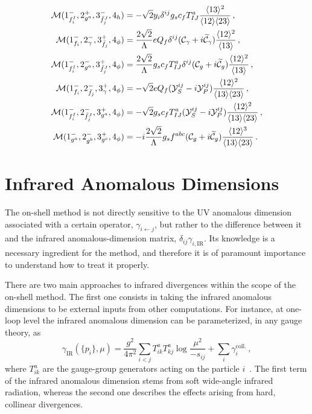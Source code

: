 \begin{subappendices}
\begin{align}
    \mathcal M(1^-_{f_i^I},2^+_{g^a},3^-_{\bar f_j^J},4_h) &= -\sqrt{2} y_i \delta^{ij} g_s c_f T^a_{IJ} \frac{\langle 1 3 \rangle^2}{\langle 1 2 \rangle\langle 2 3 \rangle} \,,\\
    \mathcal M(1^-_{f_i},2^-_\gamma,3^+_{\bar f_j},4_\phi) &= \frac{2\sqrt 2}{\Lambda} e Q_f \delta^{ij}(\mathcal C_\gamma + i\widetilde{\mathcal C}_\gamma)\frac{\langle 1 2 \rangle^2}{\langle 1 3 \rangle}\,,\\
    \mathcal M(1^-_{f_i^I},2^-_{g^a},3^+_{\bar f_j^J},4_\phi) &= \frac{2\sqrt 2}{\Lambda} g_s c_f T^a_{IJ} \delta^{ij}(\mathcal C_g + i\widetilde{\mathcal C}_g)\frac{\langle 1 2 \rangle^2}{\langle 1 3 \rangle}\,,\\
    \mathcal M(1^-_{f_i},2^-_{\bar f_j},3^+_\gamma,4_\phi) &= -\sqrt 2 e Q_f (\mathcal Y_S^{ij}-i\mathcal Y_P^{ij})\frac{\langle 1 2 \rangle^2}{\langle 1 3 \rangle\langle 2 3 \rangle} \,,\\
    \mathcal M(1^-_{f_i^I},2^-_{\bar f_j^J},3^+_{g^a},4_\phi) &= -\sqrt 2 g_s c_f T^a_{IJ} (\mathcal Y_S^{ij}-i\mathcal Y_P^{ij})\frac{\langle 1 2 \rangle^2}{\langle 1 3 \rangle\langle 2 3 \rangle}\,,\\
    \mathcal M(1^-_{g^a},2^-_{g^b},3^+_{g^c},4_\phi) &= -i\frac{2\sqrt 2}{\Lambda}g_sf^{abc}(\mathcal C_g+i\widetilde{\mathcal C}_g)\frac{\langle 1 2 \rangle^3}{\langle 1 3 \rangle\langle 2 3 \rangle}\,.
\end{align}

\section{Infrared Anomalous Dimensions}
\label{app:ALP_IR}

The on-shell method is not directly sensitive to the UV anomalous dimension associated
with a certain operator, $\gamma_{i\leftarrow j}$, but rather to the difference between it and
the infrared anomalous-dimension matrix, $\delta_{ij} \gamma_{i,\text{IR}}$.
Its knowledge is a necessary ingredient for the method, and therefore it is of paramount
importance to understand how to treat it properly.

There are two main approaches to infrared divergences within the scope of the on-shell method.
The first one consists in taking the infrared anomalous dimensions to be external inputs from
other computations.
For instance, at one-loop level the infrared anomalous dimension can be parameterized, in any
gauge theory, as
\begin{equation}
    \gamma_{\text{IR}} (\{p_i\}, \mu) = \frac{g^2}{4 \pi^2} \sum_{i<j} T^a_{ik} T^a_{kj} \log \frac{\mu^2}{-s_{ij}} + \sum_i \gamma_i^{\text{coll.}}\,,
\end{equation}
where $T_{ik}^a$ are the gauge-group generators acting on the particle $i$~\cite{Becher:2009cu}.
The first term of the infrared anomalous dimension stems from soft wide-angle infrared
radiation, whereas the second one describes the effects arising from hard, collinear
divergences.


\end{subappendices}

